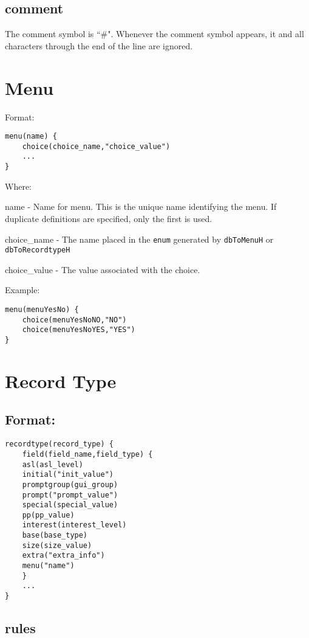 \subsection{comment}

The comment symbol is ``\#". Whenever the comment symbol appears, it and all characters through the end of the line are 
ignored.

\section{Menu}

Format:

\begin{verbatim}menu(name) {
    choice(choice_name,"choice_value")
    ...
}
\end{verbatim}Where:

\begin{description}\item name - Name for menu. This is the unique name identifying the menu. If duplicate definitions are specified, only 
the first is used.

\item choice\_name - The name placed in the \verb|enum| generated by \verb|dbToMenuH| or \verb|dbToRecordtypeH|

\item choice\_value - The value associated with the choice.

\end{description}Example:

\begin{verbatim}
menu(menuYesNo) {
    choice(menuYesNoNO,"NO")
    choice(menuYesNoYES,"YES")
}
\end{verbatim}\section{Record Type}

\subsection{Format:}

\begin{verbatim}
recordtype(record_type) {
    field(field_name,field_type) {
    asl(asl_level)
    initial("init_value")
    promptgroup(gui_group)
    prompt("prompt_value")
    special(special_value)
    pp(pp_value)
    interest(interest_level)
    base(base_type)
    size(size_value)
    extra("extra_info")
    menu("name")
    }
    ...
}
\end{verbatim}\subsection{rules}

